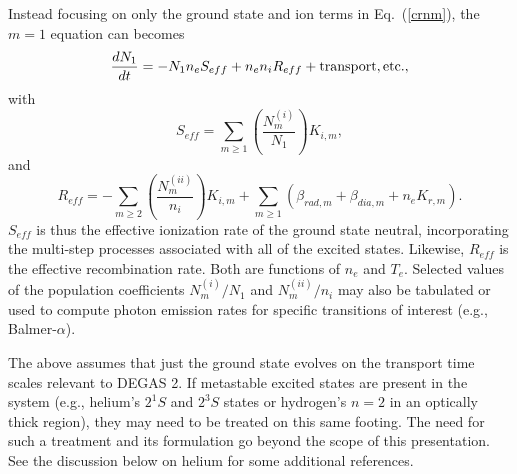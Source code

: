 \documentclass[12pt]{report}
\begin{document}
Instead focusing on only the ground state and ion
terms in Eq.~(\ref{crnm}), the $m = 1$ equation can becomes
\begin{equation}
\frac{d N_{1}}{d t} = - N_{1} n_{e} S_{eff} + n_{e} n_{i} R_{eff} + {\rm
transport, etc.},
\end{equation}
with
\begin{equation}
S_{eff} = \sum_{m \geq 1} \left( \frac{N^{(i)}_{m}}{N_{1}}\right) K_{i,m},
\end{equation}
and
\begin{equation}
R_{eff} = - \sum_{m \geq 2} \left( \frac{N^{(ii)}_{m}}{n_{i}}\right) K_{i,m}
+ \sum_{m \geq 1} \left( \beta_{rad,m} + \beta_{dia,m} + n_{e} K_{r,m} \right).
\end{equation}
$S_{eff}$ is thus the effective ionization rate of the ground state
neutral, incorporating the multi-step processes associated with all
of the excited states. Likewise, $R_{eff}$ is the effective recombination
rate. Both are functions of $n_{e}$ and $T_{e}$. Selected
values of
the population coefficients  $N^{(i)}_{m}/N_{1}$ and
$N^{(ii)}_{m}/n_{i}$ may also be tabulated or used to compute
photon emission rates for specific transitions of interest
(e.g., Balmer-$\alpha$).

The above assumes that just the ground state evolves on the transport
time scales relevant to DEGAS 2. If metastable excited states
are present in the system (e.g., helium's $2^{1}S$ and $2^{3}S$
states or hydrogen's $n = 2$ in an optically thick region),
they may need to be treated on this same footing. The need
for such a treatment and its formulation go beyond the
scope of this presentation. See the discussion below on
helium for some additional references.
\end{document}
